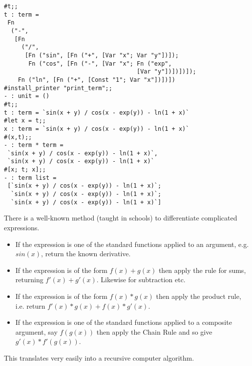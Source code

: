 \begin{slide*}


\vspace*{0.1cm}

\begin{black}\begin{footnotesize}\begin{verbatim}
#t;;
t : term =
 Fn
  ("-",
   [Fn
     ("/",
      [Fn ("sin", [Fn ("+", [Var "x"; Var "y"])]);
       Fn ("cos", [Fn ("-", [Var "x"; Fn ("exp",
                                      [Var "y"])])])]);
    Fn ("ln", [Fn ("+", [Const "1"; Var "x"])])])
#install_printer "print_term";;
- : unit = ()
#t;;
t : term = `sin(x + y) / cos(x - exp(y)) - ln(1 + x)`
#let x = t;;
x : term = `sin(x + y) / cos(x - exp(y)) - ln(1 + x)`
#(x,t);;
- : term * term =
 `sin(x + y) / cos(x - exp(y)) - ln(1 + x)`,
 `sin(x + y) / cos(x - exp(y)) - ln(1 + x)`
#[x; t; x];;
- : term list =
 [`sin(x + y) / cos(x - exp(y)) - ln(1 + x)`;
  `sin(x + y) / cos(x - exp(y)) - ln(1 + x)`;
  `sin(x + y) / cos(x - exp(y)) - ln(1 + x)`]
\end{verbatim}\end{footnotesize}\end{black}

\end{slide*}





\begin{slide*}


\vspace*{0.1cm}

There is a well-known method (taught in schools) to differentiate complicated
expressions.

\begin{itemize}

\item If the expression is one of the standard functions applied to an
argument, e.g. {\red $sin(x)$}, return the known derivative.

\item If the expression is of the form {\red $f(x) + g(x)$} then apply the rule
for sums, returning {\red $f'(x) + g'(x)$}. Likewise for subtraction etc.

\item If the expression is of the form {\red $f(x) * g(x)$} then apply the
product rule, i.e. return {\red $f'(x) * g(x) + f(x) * g'(x)$}.

\item If the expression is one of the standard functions applied to a composite
argument, say {\red $f(g(x))$} then apply the Chain Rule and so give {\red
$g'(x) * f'(g(x))$}.

\end{itemize}

This translates very easily into a recursive computer algorithm.

\end{slide*}



